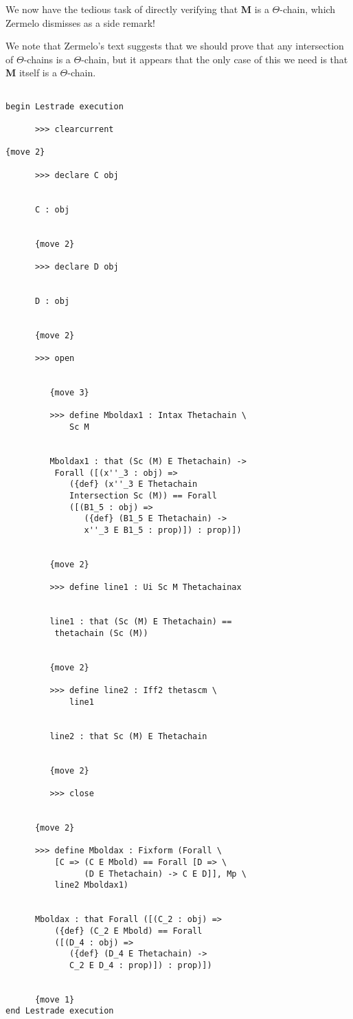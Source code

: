 \documentclass[12pt]{article}
\begin{document}
We now have the tedious task of directly verifying that {\bf M} is a $\Theta$-chain, which Zermelo dismisses as a side remark!

We note that Zermelo's text suggests that we should prove that any intersection of $\Theta$-chains is a $\Theta$-chain, but it appears that the only case
of this we need is that  {\bf M} itself is a $\Theta$-chain.


\begin{verbatim}

begin Lestrade execution

      >>> clearcurrent

{move 2}

      >>> declare C obj


      C : obj


      {move 2}

      >>> declare D obj


      D : obj


      {move 2}

      >>> open


         {move 3}

         >>> define Mboldax1 : Intax Thetachain \
             Sc M


         Mboldax1 : that (Sc (M) E Thetachain) -> 
          Forall ([(x''_3 : obj) => 
             ({def} (x''_3 E Thetachain 
             Intersection Sc (M)) == Forall 
             ([(B1_5 : obj) => 
                ({def} (B1_5 E Thetachain) -> 
                x''_3 E B1_5 : prop)]) : prop)])


         {move 2}

         >>> define line1 : Ui Sc M Thetachainax


         line1 : that (Sc (M) E Thetachain) == 
          thetachain (Sc (M))


         {move 2}

         >>> define line2 : Iff2 thetascm \
             line1


         line2 : that Sc (M) E Thetachain


         {move 2}

         >>> close


      {move 2}

      >>> define Mboldax : Fixform (Forall \
          [C => (C E Mbold) == Forall [D => \
                (D E Thetachain) -> C E D]], Mp \
          line2 Mboldax1)


      Mboldax : that Forall ([(C_2 : obj) => 
          ({def} (C_2 E Mbold) == Forall 
          ([(D_4 : obj) => 
             ({def} (D_4 E Thetachain) -> 
             C_2 E D_4 : prop)]) : prop)])


      {move 1}
end Lestrade execution
\end{verbatim}
\end{document}
